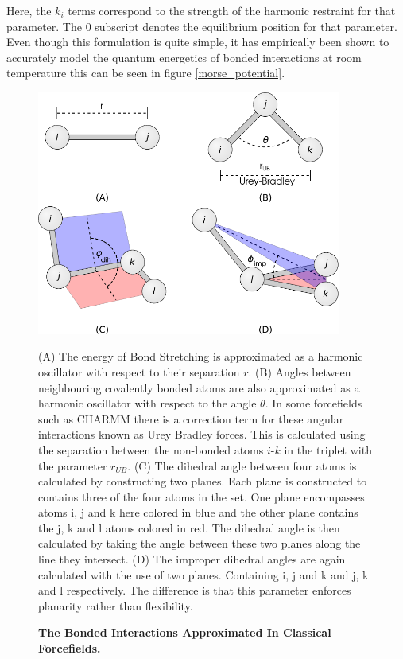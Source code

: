 Here, the $k_i$ terms correspond to the strength of the harmonic restraint for that parameter. The $0$ subscript denotes the equilibrium position for that parameter. Even though this formulation is quite simple, it has empirically been shown to accurately model the quantum energetics of bonded interactions at room temperature this can be seen in figure \ref{morse_potential}.

\begin{figure}
	\begin{center}
	\includegraphics[width=10cm]{figures/bonded_interactions.pdf}
	\end{center}
	\captionsetup{singlelinecheck = false, justification=raggedright}
	\caption[The Bonded Interactions Approximated In Classical Forcefields]{\textbf{The Bonded Interactions Approximated In Classical Forcefields.}}{
		(A) The energy of Bond Stretching is approximated as a harmonic oscillator with respect to their separation $r$. (B) Angles between neighbouring covalently bonded atoms are also approximated as a harmonic oscillator with respect to the angle $\theta$. In some forcefields such as CHARMM there is a correction term for these angular interactions known as Urey Bradley forces. This is calculated using the separation between the non-bonded atoms $i$-$k$ in the triplet with the parameter $r_{UB}$. (C) The dihedral angle between four atoms is calculated by constructing two planes. Each plane is constructed to contains three of the four atoms in the set. One plane encompasses atoms i, j and k here  colored in blue and the other plane contains the j, k and l atoms colored in red. The dihedral angle is then calculated by taking the angle between these two planes along the line they intersect. (D) The improper dihedral angles are again calculated with the use of two planes. Containing i, j and k and j, k and l respectively. The difference is that this parameter enforces planarity rather than flexibility.
	}
	\label{charmm_bonded}
\end{figure}


